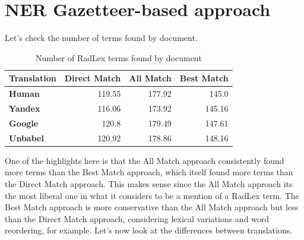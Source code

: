 \label{chap4}





\section{NER Gazetteer-based approach}

Let's check the number of terms found by document.


\begin{table}[ht]
    \centering
    \begin{tabular}{lrrr}
    \toprule
    \textbf{Translation}   &   \textbf{Direct Match} &   \textbf{All Match} &   \textbf{Best Match} \\
    \midrule
     \textbf{Human}         &         119.55 &      177.92 &       145.0 \\

     \textbf{Yandex}        &         116.06 &      173.92 &       145.16 \\

     \textbf{Google}        &         120.8 &      179.49 &       147.61 \\

     \textbf{Unbabel}       &         120.92 &      178.86 &       148.16 \\

    \bottomrule
    \end{tabular} 
    \caption{Number of RadLex terms found by document}
    \label{table:terms_by_document}
\end{table}

One of the highlights here is that the All Match approach consistently found more terms than the Best Match approach, which itself found more terms than the Direct Match approach. This makes sense since the All Match approach its the most liberal one in what it considers to be a mention of a RadLex term. The Best Match approach is more conservative than the All Match approach but less than the Direct Match approach, considering lexical variations and word reordering, for example. Let's now look at the differences between translations.



